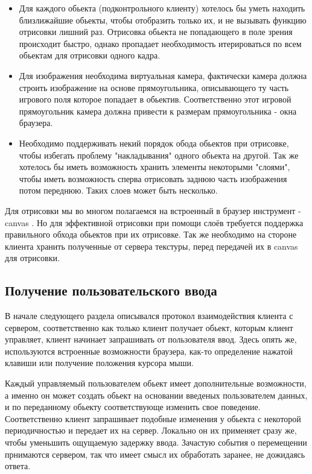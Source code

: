 \documentclass[a4paper,14pt, openany]{book}
\begin{document}
\begin{itemize}
  \item Для каждого обьекта (подконтрольного клиенту) хотелось бы уметь находить близлижайшие обьекты, чтобы отобразить только их, и не вызывать функцию отрисовки лишний раз. Отрисовка обьекта не попадающего в поле зрения происходит быстро, однако пропадает необходимость итерироваться по всем обьектам для отрисовки одного кадра.
  \item Для изображения необходима виртуальная камера, фактически камера должна строить изображение на основе прямоугольника, описывающего ту часть игрового поля которое попадает в обьектив. Соответственно этот игровой прямоугольник камера должна привести к размерам прямоугольника - окна браузера.
  \item Необходимо поддерживать некий порядок обода обьектов при отрисовке, чтобы избегать проблему "накладывания" одного обьекта на другой. Так же хотелось бы иметь возможность хранить элементы некоторыми "слоями", чтобы иметь возможность сперва отрисовать заднюю часть изображения потом переднюю. Таких слоев может быть несколько.
\end{itemize}

Для отрисовки мы во многом полагаемся на встроенный в браузер инструмент - canvas \cite{canvas}. Но для эффективной отрисовки при помощи слоёв требуется поддержка правильного обхода обьектов при их отрисовке. Так же необходимо на стороне клиента хранить полученные от сервера текстуры, перед передачей их в canvas для отрисовки.

\subsection{Получение пользовательского ввода}

В начале следующего раздела описывался протокол взаимодействия клиента с сервером, соответственно как только клиент получает обьект, которым клиент управляет, клиент начинает запрашивать от пользователя ввод. Здесь опять же, используются встроенные возможности браузера, как-то определение нажатой клавиши или получение положения курсора мыши. 

Каждый управляемый пользователем обьект имеет дополнительные возможности, а именно он может создать обьект на основании введеных пользователем данных, и по переданному обьекту соответствующе изменить свое поведение. Соответственно клиент запрашивает подобные изменения у обьекта с некоторой периодичностью и передает их на сервер. Локально он их применяет сразу же, чтобы уменьшить ощущаемую задержку ввода. Зачастую события о перемещении прнимаются сервером, так что имеет смысл их обработать заранее, не дожидаясь ответа.
\end{document}
